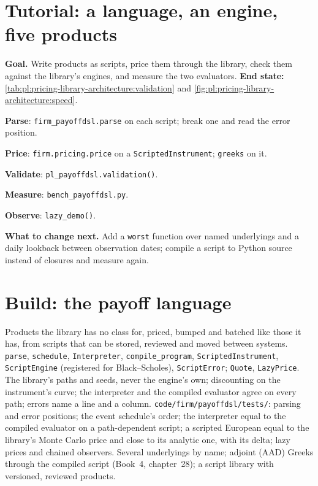 \section{Tutorial: a language, an engine, five products}\label{tut:pl:pricing-library-architecture:tut}

\begin{tutorial}
\textbf{Goal.} Write products as scripts, price them through the library, check them against the library's engines, and measure the two
evaluators. \textbf{End state:} \cref{tab:pl:pricing-library-architecture:validation} and \cref{fig:pl:pricing-library-architecture:speed}.
\begin{tutsteps}
\item \textbf{Parse}: \texttt{firm\_payoffdsl.parse} on each script; break one and read the error position.
\item \textbf{Price}: \texttt{firm.pricing.price} on a \texttt{ScriptedInstrument}; \texttt{greeks} on it.
\item \textbf{Validate}: \texttt{pl\_payoffdsl.validation()}.
\item \textbf{Measure}: \texttt{bench\_payoffdsl.py}.
\item \textbf{Observe}: \texttt{lazy\_demo()}.
\end{tutsteps}
\textbf{What to change next.} Add a \texttt{worst} function over named underlyings and a daily lookback between observation dates; compile a
script to Python source instead of closures and measure again.
\end{tutorial}

\section{Build: the payoff language}\label{bld:pl:pricing-library-architecture:payoffdsl}

\begin{build}
 Products the library has no class for, priced, bumped and batched like those it has, from scripts that can be stored,
reviewed and moved between systems.
 \texttt{parse}, \texttt{schedule}, \texttt{Interpreter}, \texttt{compile\_program}, \texttt{ScriptedInstrument},
\texttt{ScriptEngine} (registered for Black--Scholes), \texttt{ScriptError}; \texttt{Quote}, \texttt{LazyPrice}.
 The library's paths and seeds, never the engine's own; discounting on the instrument's curve; the interpreter and the compiled
evaluator agree on every path; errors name a line and a column.
 \texttt{code/firm/payoffdsl/tests/}: parsing and error positions; the event schedule's order; the interpreter equal
to the compiled evaluator on a path-dependent script; a scripted European equal to the library's Monte Carlo price and close to its analytic
one, with its delta; lazy prices and chained observers.
 Several underlyings by name; adjoint (AAD) Greeks through the compiled script (Book~4, chapter~28); a script library with
versioned, reviewed products.
\end{build}

